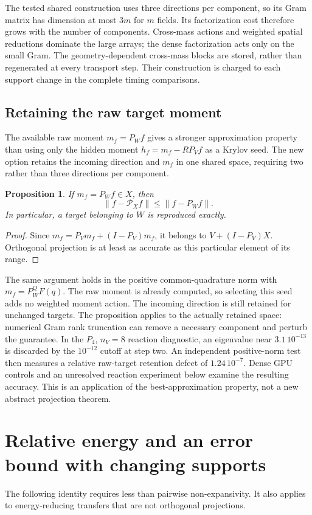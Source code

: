 \documentclass[10pt,a4paper]{article}
\newtheorem{proposition}{Proposition}
\begin{document}
The tested shared construction uses three directions per component,
so its Gram matrix has dimension at most $3m$ for $m$ fields. Its
factorization cost therefore grows with the number of components.
Cross-mass actions and weighted spatial reductions dominate the large
arrays; the dense factorization acts only on the small Gram. The
geometry-dependent cross-mass blocks are stored, rather than regenerated
at every transport step. Their construction is charged to each support
change in the complete timing comparisons.

\subsection{Retaining the raw target moment}
The available raw moment $m_f=P_Wf$ gives a stronger approximation
property than using only the hidden moment $h_f=m_f-RP_Vf$ as a Krylov
seed. The new option retains the incoming direction and $m_f$ in one
shared space, requiring two rather than three directions per component.

\begin{proposition}\label{prop:target-seed}
If $m_f=P_Wf\in X$, then
\[
 \|f-\mathcal P_Xf\|\leq\|f-P_Wf\|.
\]
In particular, a target belonging to $W$ is reproduced exactly.
\end{proposition}
\begin{proof}
Since $m_f=P_Vm_f+(I-P_V)m_f$, it belongs to
$V+(I-P_V)X$. Orthogonal projection is at least as accurate as this
particular element of its range.
\end{proof}
The same argument holds in the positive common-quadrature norm with
$m_f=P_W^QF(q)$. The raw moment is already computed, so selecting this
seed adds no weighted moment action. The incoming direction is still
retained for unchanged targets. The proposition applies to the actually
retained space: numerical Gram rank truncation can remove a necessary
component and perturb the guarantee. In the $P_4$, $n_V=8$ reaction
diagnostic, an eigenvalue near $3.1\,10^{-13}$ is discarded by the
$10^{-12}$ cutoff at step two. An independent positive-norm test then
measures a relative raw-target retention defect of $1.24\,10^{-7}$. Dense GPU controls and an unresolved
reaction experiment below examine the resulting accuracy. This is an
application of the best-approximation property, not a new abstract
projection theorem.

\section{Relative energy and an error bound with changing supports}
The following identity requires less than pairwise non-expansivity.
It also applies to energy-reducing transfers that are not orthogonal
projections.
\end{document}
